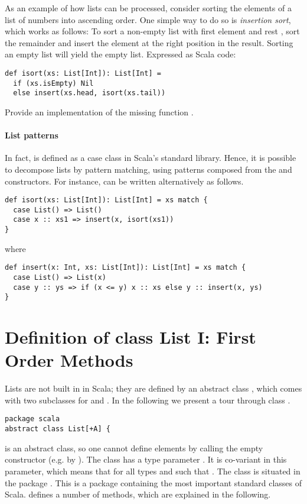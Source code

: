 As an example of how lists can be processed, consider sorting the
elements of a list of numbers into ascending order. One simple way to
do so is {\em insertion sort}, which works as follows: To sort a
non-empty list with first element  and rest , sort
the remainder  and insert the element  at the right
position in the result. Sorting an empty list will yield the
empty list. Expressed as Scala code:
\begin{lstlisting}
def isort(xs: List[Int]): List[Int] =
  if (xs.isEmpty) Nil
  else insert(xs.head, isort(xs.tail))
\end{lstlisting}

\begin{exercise} Provide an implementation of the missing function
.
\end{exercise}

\paragraph{List patterns} In fact, \code{::} is defined as a case
class in Scala's standard library. Hence, it is possible to decompose
lists by pattern matching, using patterns composed from the 
and \code{::} constructors. For instance,  can be written
alternatively as follows.
\begin{lstlisting}
def isort(xs: List[Int]): List[Int] = xs match {
  case List() => List()
  case x :: xs1 => insert(x, isort(xs1))
}
\end{lstlisting}
where
\begin{lstlisting}
def insert(x: Int, xs: List[Int]): List[Int] = xs match {
  case List() => List(x)
  case y :: ys => if (x <= y) x :: xs else y :: insert(x, ys)
}
\end{lstlisting}

\section{Definition of class List I: First Order Methods}
\label{sec:list-first-order}

Lists are not built in in Scala; they are defined by an abstract class
, which comes with two subclasses for \code{::} and .
In the following we present a tour through class .
\begin{lstlisting}
package scala
abstract class List[+A] {
\end{lstlisting}
 is an abstract class, so one cannot define elements by
calling the empty  constructor (e.g. by
).  The class has a type parameter . It is
co-variant in this parameter, which means that
 for all types  and  such that
.  The class is situated in the package
. This is a package containing the most important standard
classes of Scala.
  defines a number of methods, which are
explained in the following.

